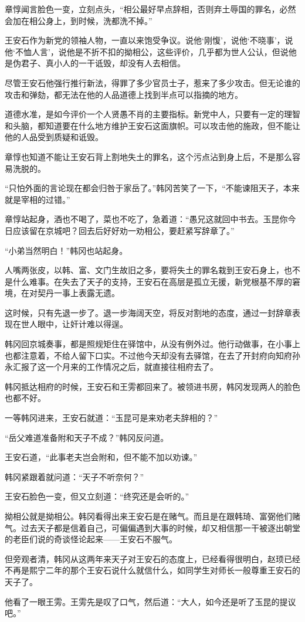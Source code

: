 章惇闻言脸色一变，立刻点头，“相公最好早点辞相，否则弃土辱国的罪名，必然会加在相公身上，到时候，洗都洗不掉。”

王安石作为新党的领袖人物，一直以来饱受争议。说他‘刚愎’，说他‘不晓事’，说他‘不恤人言’，说他是不折不扣的拗相公，这些评价，几乎都为世人公认，但说他是伪君子、真小人的一干诋毁，却没有人去相信。

尽管王安石他强行推行新法，得罪了多少官员士子，惹来了多少攻击。但无论谁的攻击和弹劾，都无法在他的人品道德上找到半点可以指摘的地方。

道德水准，是如今评价一个人贤愚不肖的主要指标。新党中人，只要有一定的理智和头脑，都知道要在什么地方维护王安石这面旗帜。可以攻击他的施政，但不能让他的人品受到质疑和诋毁。

章惇也知道不能让王安石背上割地失土的罪名，这个污点沾到身上后，不是那么容易洗脱的。

“只怕外面的言论现在都会归咎于家岳了。”韩冈苦笑了一下，“不能谏阻天子，本来就是宰相的过错。”

章惇站起身，酒也不喝了，菜也不吃了，急着道：“愚兄这就回中书去。玉昆你今日应该留在京城吧？回去后好好劝一劝相公，要赶紧写辞章了。”

“小弟当然明白！”韩冈也站起身。

人嘴两张皮，以韩、富、文门生故旧之多，要将失土的罪名栽到王安石身上，也不是什么难事。在失去了天子的支持，王安石在高层是孤立无援，新党根基不厚的窘境，在对契丹一事上表露无遗。

这时候，只有先退一步了。退一步海阔天空，将反对割地的态度，通过一封辞章表现在世人眼中，让奸计难以得逞。

韩冈回京城奏事，都是照规矩住在驿馆中，从没有例外过。他行动做事，在小事上也都注意着，不给人留下口实。不过他今天却没有去驿馆，在去了开封府向知府孙永汇报了这一个月来的工作情况之后，就直接往相府去了。

韩冈抵达相府的时候，王安石和王雱都回来了。被领进书房，韩冈发现两人的脸色也都不好。

一等韩冈进来，王安石就道：“玉昆可是来劝老夫辞相的？”

“岳父难道准备附和天子不成？”韩冈反问道。

王安石道，“此事老夫岂会附和，但不能不加以劝谏。”

韩冈紧跟着就问道：“天子不听奈何？”

王安石脸色一变，但又立刻道：“终究还是会听的。”

拗相公就是拗相公。韩冈看得出来王安石是在赌气。而且是在跟韩琦、富弼他们赌气。过去天子都是信着自己，可偏偏遇到大事的时候，却又相信那一干被逐出朝堂的老臣们说的奇谈怪论起来——王安石不服气。

但旁观者清，韩冈从这两年来天子对王安石的态度上，已经看得很明白，赵顼已经不再是熙宁二年的那个王安石说什么就信什么，如同学生对师长一般尊重王安石的天子了。

他看了一眼王雱。王雱先是叹了口气，然后道：“大人，如今还是听了玉昆的提议吧。”

